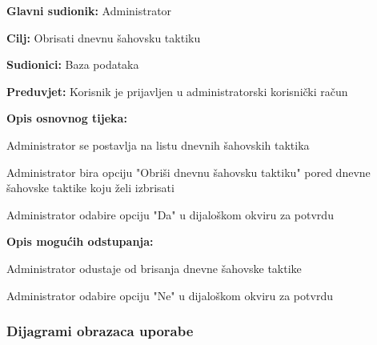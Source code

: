 	
		\noindent {}
		\begin{packed_item}
			
			\item \textbf{Glavni sudionik: } Administrator
			\item  \textbf{Cilj: } Obrisati dnevnu šahovsku taktiku
			\item  \textbf{Sudionici: } Baza podataka
			\item  \textbf{Preduvjet: } Korisnik je prijavljen u administratorski korisnički račun
			\item  \textbf{Opis osnovnog tijeka:}
			
			\item[] \begin{packed_enum}
				
				\item Administrator se postavlja na listu dnevnih šahovskih taktika
				\item Administrator bira opciju "Obriši dnevnu šahovsku taktiku" pored dnevne šahovske taktike koju želi izbrisati
				\item Administrator odabire opciju "Da" u dijaloškom okviru za potvrdu
			\end{packed_enum}
			
			\item  \textbf{Opis mogućih odstupanja:}
			
			\item[] \begin{packed_item}
				
				\item[3.a] Administrator odustaje od brisanja dnevne šahovske taktike
				\item[] \begin{packed_enum}
					
					\item Administrator odabire opciju "Ne" u dijaloškom okviru za potvrdu
					
				\end{packed_enum}
			\end{packed_item}
			
		\end{packed_item}
		
		\eject
	
		
	
				\subsubsection{Dijagrami obrazaca uporabe}
					
